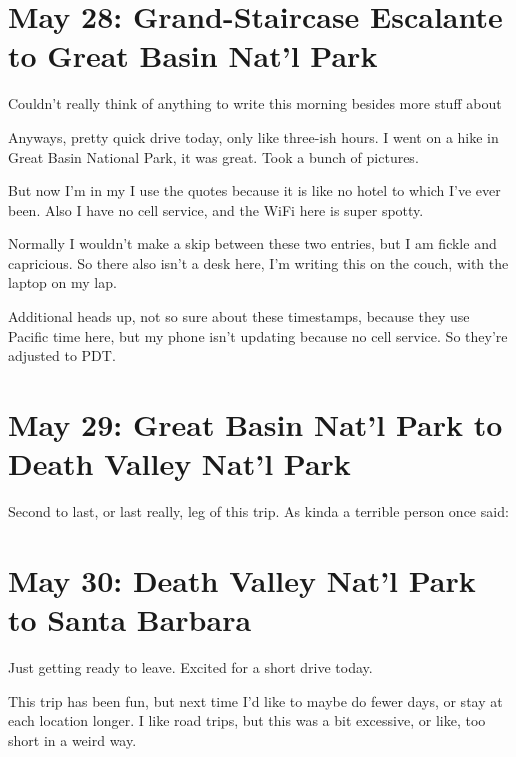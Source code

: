 \documentclass[../butidigress.tex]{subfiles}
\begin{document}
\section{May 28: Grand-Staircase Escalante to Great Basin Nat'l Park}
Couldn't really think of anything to write this morning besides more stuff about 

Anyways, pretty quick drive today, only like three-ish hours.
I went on a hike in Great Basin National Park, it was great.
Took a bunch of pictures.

But now I'm in my 
I use the quotes because it is like no hotel to which I've ever been.
Also I have no cell service, and the WiFi here is super spotty.

\entryskip

Normally I wouldn't make a skip between these two entries, but I am fickle and capricious.
So there also isn't a desk here, I'm writing this on the couch, with the laptop on my lap.

Additional heads up, not so sure about these timestamps, because they use Pacific time here, but my phone isn't updating because no cell service.
So they're adjusted to PDT.

\section{May 29: Great Basin Nat'l Park to Death Valley Nat'l Park}
Second to last, or last really, leg of this trip.
As kinda a terrible person once said: 

\section{May 30: Death Valley Nat'l Park to Santa Barbara}
Just getting ready to leave.
Excited for a short drive today.

This trip has been fun, but next time I'd like to maybe do fewer days, or stay at each location longer.
I like road trips, but this was a bit excessive, or like, too short in a weird way.
\end{document}

